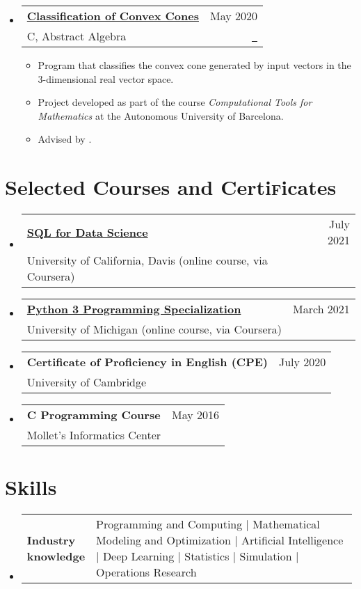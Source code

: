 \documentclass[a4paper,10pt]{article}
\makeatletter
\newcommand{\resumeItemListEnd}{\end{itemize}}
\newcommand{\resumeSectionTypeOne}[2]{
  \item\begin{tabular*}{0.99\textwidth}[t]{
    p{0.18\linewidth}p{0.81\linewidth}
  }
  \textbf{#1} & #2
  \end{tabular*}\vspace{-2pt}
}
\newcommand{\resumeQuadHeading}[4]{
  \item
  \begin{tabular*}{0.96\textwidth}[t]{l@{\extracolsep{\fill}}r}
    \textbf{#1} & \small #2 \\
    \small#3 & \small #4 \\
  \end{tabular*}
}
\newcommand{\resumeHeadingListStart}{
  \begin{itemize}[leftmargin=0.15in, label={}]
}
\newcommand{\resumeHeadingListEnd}{\end{itemize}}
\makeatother
\begin{document}
  \resumeHeadingListStart{}
    \resumeQuadHeading{\href{https://github.com/loredanasandu/cone-classification}{Classification of Convex Cones}}{May 2020}{C, Abstract Algebra}{\href{https://github.com/loredanasandu/cone-classification}{\faGithub \ \graydotuline{Source code}}}
    \begin{itemize}[leftmargin=3em, itemsep=0.1em, topsep=2pt]
      \item \small Program that classifies the convex cone generated by input vectors in the 3-dimensional real vector space.
      \item \small Project developed as part of the course \textit{Computational Tools for Mathematics} at the Autonomous University of Barcelona.
      \item \small Advised by \href{https://mat.uab.cat/geoarit/index.php/people?controller=member&view=member&id=1}{}.
    \end{itemize}
  \resumeItemListEnd{}




\section{Selected Courses and Certi\textsc{f}icates}
  \resumeHeadingListStart{}
    \resumeQuadHeading{\href{https://www.coursera.org/account/accomplishments/verify/ZNTSZQQ9TLQK}{SQL for Data Science}}{July 2021}{University of California, Davis (online course, via Coursera)}{\ }
  \resumeHeadingListEnd{}

  \resumeHeadingListStart{}
    \resumeQuadHeading{\href{https://www.coursera.org/account/accomplishments/specialization/WMG73QR4GJLH}{Python 3 Programming Specialization}}{March 2021}{University of Michigan (online course, via Coursera)}{\ }
  \resumeHeadingListEnd{}

  \resumeHeadingListStart{}
    \resumeQuadHeading{Certificate of Proficiency in English (CPE)}{July 2020}{University of Cambridge}{\ }
  \resumeHeadingListEnd{}

  \resumeHeadingListStart{}
    \resumeQuadHeading{C Programming Course}{May 2016}{Mollet's Informatics Center}{\ }
  \resumeHeadingListEnd{}


\section{Skills}
  \resumeHeadingListStart{}
    \resumeSectionTypeOne{Industry knowledge}{Programming and Computing \; $|$ \; Mathematical Modeling and Optimization \; $|$ \; Artificial Intelligence \; $|$ \; Deep Learning \; $|$ \; Statistics \; $|$ \; Simulation \; $|$ \; Operations Research}
  \resumeHeadingListEnd{}
\end{document}
